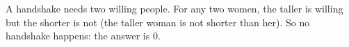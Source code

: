 A handshake needs two willing people. For any two women, the taller is willing but the shorter is not (the taller woman is not shorter than her). So no handshake happens: the answer is $\boxed{0}$.
